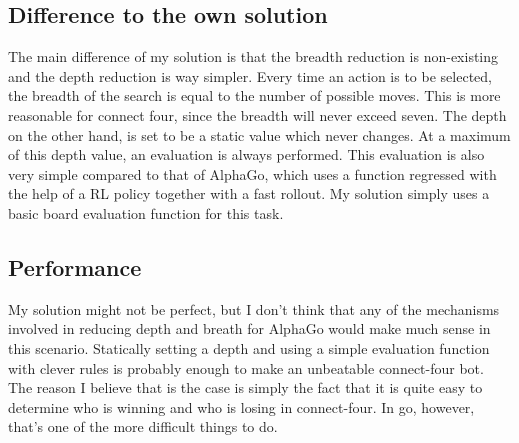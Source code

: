 \documentclass[a4paper]{article}
\begin{document}
\subsection{Difference to the own solution}
The main difference of my solution is that the breadth reduction is non-existing and the depth reduction is way simpler. Every time an action is to be selected, the breadth of the search is equal to the number of possible moves. This is more reasonable for connect four, since the breadth will never exceed seven. The depth on the other hand, is set to be a static value which never changes. At a maximum of this depth value, an evaluation is always performed. This evaluation is also very simple compared to that of AlphaGo, which uses a function regressed with the help of a RL policy together with a fast rollout. My solution simply uses a basic board evaluation function for this task.

\subsection{Performance}
My solution might not be perfect, but I don't think that any of the mechanisms involved in reducing depth and breath for AlphaGo would make much sense in this scenario. Statically setting a depth and using a simple evaluation function with clever rules is probably enough to make an unbeatable connect-four bot. The reason I believe that is the case is simply the fact that it is quite easy to determine who is winning and who is losing in connect-four. In go, however, that's one of the more difficult things to do.



\end{document}
